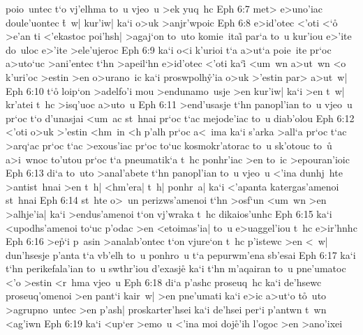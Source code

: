 poio~untec
t`o
vj'elhma
to~u
vjeo~u
>ek
yuq~hc\bibvsend
\vs Eph 6:7
met>
e>uno'iac
doule'uontec
\r{t}~w|
kur'iw|
ka`i
o>uk
>anjr'wpoic\bibvsend
\vs Eph 6:8
e>id'otec
<'oti
<`o\r{}
>e'an
ti
<'ekastoc
poi'hsh|
>agaj`on
to~uto
komie~itai\r{}
par`a
to~u
kur'iou
e>'ite
do~uloc
e>'ite
>ele'ujeroc\bibvsend
\vs Eph 6:9
ka`i
o<i
k'urioi
t`a
a>ut`a
poie~ite
pr`oc
a>uto`uc
>ani'entec
t`hn
>apeil`hn
e>id'otec
<'oti
ka`i\r{}
<um~wn
a>ut~wn
<o
k'uri'oc
>estin
>en
o>urano~ic
ka`i
proswpolh\r{y}'ia
o>uk
>'estin
par>
a>ut~w|\bibvsend
\vs Eph 6:10
t`o\r{}
loip`on
>adelfo'i
mou
>endunamo~usje
>en
kur'iw|
ka`i
>en
t~w|
kr'atei
t~hc
>isq'uoc
a>uto~u\bibvsend
\vs Eph 6:11
>end'usasje
t`hn
panopl'ian
to~u
vjeo~u
pr`oc
t`o
d'unasjai
<um~ac
st~hnai
pr`oc
t`ac
mejode'iac
to~u
diab'olou\bibvsend
\vs Eph 6:12
<'oti
o>uk
>'estin
<hm~in
<h
p'alh
pr`oc
a<~ima
ka`i
s'arka
>all`a
pr`oc
t`ac
>arq`ac
pr`oc
t`ac
>exous'iac
pr`oc
to`uc
kosmokr'atorac
to~u
sk'otouc
to~u\r{}
a>i~wnoc
to'utou
pr`oc
t`a
pneumatik`a
t~hc
ponhr'iac
>en
to~ic
>epouran'ioic\bibvsend
\vs Eph 6:13
di`a
to~uto
>anal'abete
t`hn
panopl'ian
to~u
vjeo~u
<'ina
dunhj~hte
>antist~hnai
>en
t~h|
<hm'era|
t~h|
ponhr~a|
ka`i
<'apanta
katergas'amenoi
st~hnai\bibvsend
\vs Eph 6:14
st~hte
o>~un
perizws'amenoi
t`hn
>osf`un
<um~wn
>en
>alhje'ia|
ka`i
>endus'amenoi
t`on
vj'wraka
t~hc
dikaios'unhc\bibvsend
\vs Eph 6:15
ka`i
<upodhs'amenoi
to`uc
p'odac
>en
<etoimas'ia|
to~u
e>uaggel'iou
t~hc
e>ir'hnhc\bibvsend
\vs Eph 6:16
>e\r{p}`i
p~asin
>analab'ontec
t`on
vjure`on
t~hc
p'istewc
>en
<~w|
dun'hsesje
p'anta
t`a
vb'elh
to~u
ponhro~u
t`a
pepurwm'ena
sb'esai\bibvsend
\vs Eph 6:17
ka`i
t`hn
perikefala'ian
to~u
swthr'iou
d'exasj\r{e}
ka`i
t`hn
m'aqairan
to~u
pne'umatoc
<'o
>estin
<r~hma
vjeo~u\bibvsend
\vs Eph 6:18
di`a
p'ashc
proseuq~hc
ka`i
de'hsewc
proseuq'omenoi
>en
pant`i
kair~w|
>en
pne'umati
ka`i
e>ic
a>ut`o
t\r{o}~uto
>agrupno~untec
>en
p'ash|
proskarter'hsei
ka`i
de'hsei
per`i
p'antwn
t~wn
<ag'iwn\bibvsend
\vs Eph 6:19
ka`i
<up`er
>emo~u
<'ina
moi
doj\r{e}'ih
l'ogoc
>en
>ano'ixei
